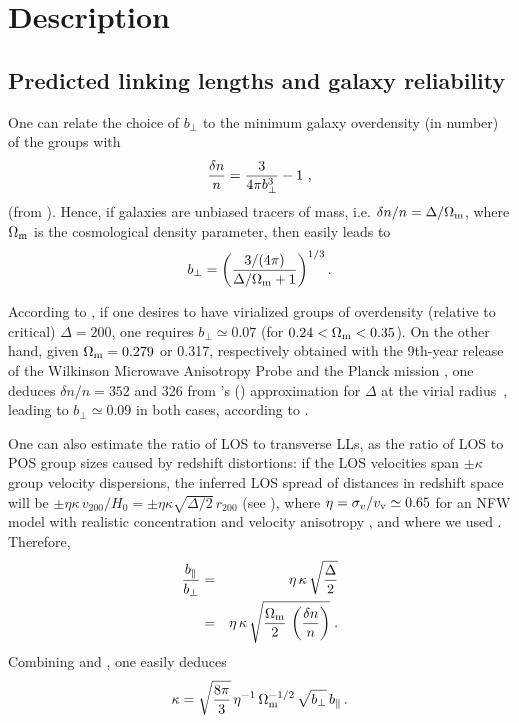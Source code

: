 \section{Description}
\label{sec:fof_description}

\subsection{Predicted linking lengths and galaxy reliability}
\label{sec:fofpred}

One can relate the choice of $b_\perp$ to the minimum galaxy overdensity (in
number) of the groups with
%
\begin{equation}
    {\delta n\over n} = {3\over 4 \pi b_\perp^3} -1 \ ,
    \label{eq:dnovernfromb}
\end{equation}
%
(from \citealp{HG82}). Hence, if galaxies are unbiased tracers of mass, i.e.
$\delta n/n = \Delta/\Omega_{\rm m}$, where $\Omega_{\rm m}$ is the
cosmological density parameter, then  easily
leads to
%
\begin{equation}
    b_\perp = {\left ({3/(4\pi)\over \Delta/\Omega_{\rm m}+1}\right)}^{1/3}\,.
    \label{eq:bperpfromDelta}
\end{equation}

According to , if one desires to have
virialized groups of overdensity (relative to critical) $\Delta=200$, one
requires $b_\perp\simeq 0.07$ (for $0.24 < \Omega_{\rm m} < 0.35$). On the
other hand, given $\Omega_{\rm m}=0.279$ or 0.317, respectively obtained with
the 9th-year release of the Wilkinson Microwave Anisotropy Probe
\citep{Bennett+13} and the Planck mission \citep{PlanckXVI}, one deduces
$\delta n/n=352$ and 326 from \citeauthor{BN98}'s (\citeyear{BN98})
approximation for $\Delta$ at the virial radius~, leading to $b_\perp \simeq
0.09$ in both cases, according to .

One can also estimate the ratio of LOS to transverse LLs, as the ratio of LOS
to POS group sizes caused by redshift distortions: if the LOS velocities span
$\pm \kappa$ group velocity dispersions, the inferred LOS spread of distances
in redshift space will be $\pm \eta \kappa\, v_{200} / H_0 = \pm \eta \kappa
\sqrt{\Delta/2}\,r_{200}$ (see \citealp{MBM10}), where  $\eta = \sigma_v/v_{\rm
v} \simeq 0.65$ for an NFW model with realistic concentration and velocity
anisotropy \citep{MBB13}, and where we used .
Therefore,
%
\begin{eqnarray}
    {b_\parallel\over b_\perp} &=&
    \eta \,\kappa\, \sqrt{\Delta \over
        2}
    \label{eq:LLratiofromDelta}\\
    &=&
    \eta \,\kappa\, \sqrt{{\Omega_{\rm m}\over
        2}\,\left({\delta n\over n}\right)} \;.
    \label{eq:bparfromkappa}
\end{eqnarray}
%
Combining  and
, one easily deduces
%
\begin{equation}
    \kappa = \sqrt{8\pi\over 3}\,\eta^{-1}\,\Omega_{\rm m}^{-1/2}\,
    \sqrt{b_\perp}\,b_\parallel \,.
    \label{eq:kappafromlls}
\end{equation}

